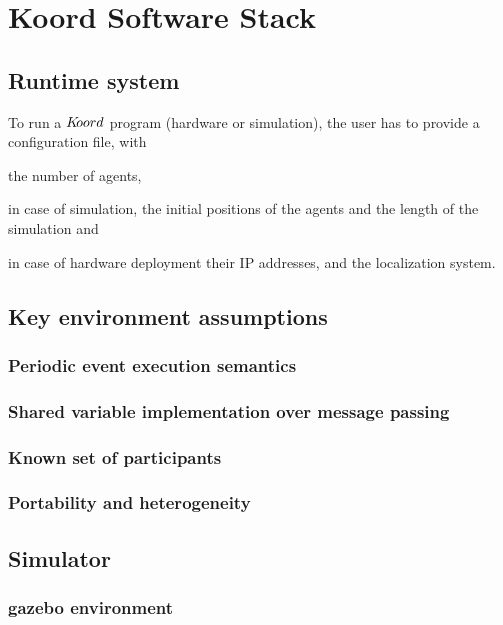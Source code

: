 \section{Koord Software Stack}
\label{sec:software}

\subsection{Runtime system}



To run a $K\kern-2pt oord$ program (hardware or simulation), the user has to provide a configuration file, with 
\begin{inparaenum}
\item the number of agents, 
\item in case of simulation, the initial positions of the agents and the length of the simulation and 
\item in case of hardware deployment their IP addresses, 
and the localization system.
\end{inparaenum} 

\subsection{Key environment assumptions} 


\subsubsection{Periodic event execution semantics}


\subsubsection{Shared variable implementation over message passing}


\subsubsection{Known set of participants}
\subsubsection{Portability and heterogeneity}


\subsection{Simulator}
\subsubsection{gazebo environment}
